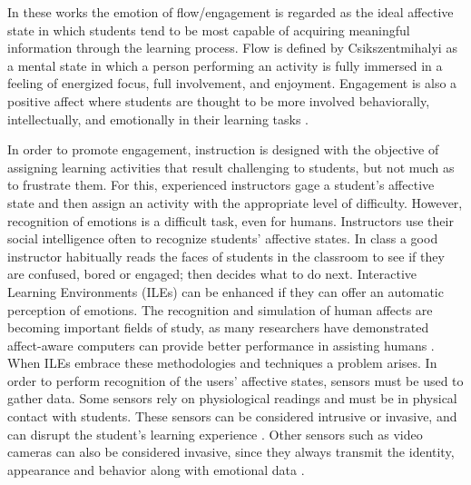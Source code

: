 \documentclass[a4paper]{llncs}
\begin{document}
In these works the emotion of flow/engagement is regarded as the ideal affective state in which
students tend to be most capable of acquiring meaningful information through the
learning process. Flow is defined by Csikszentmihalyi \cite{csikszentmihalyi1990flow}
as a mental state in which a person performing an activity is fully immersed in a feeling of
energized focus, full involvement, and enjoyment. Engagement is also a positive
affect where students are thought to be more involved behaviorally,
intellectually, and emotionally in their learning tasks \cite{bangert2002teacher}.

In order to promote engagement, instruction is designed with the
objective of assigning learning activities
that result challenging to students, but not much as to frustrate them. For
this, experienced instructors gage a student’s affective state and then assign
an activity with the appropriate level of difficulty. However, recognition of 
emotions is a difficult task, even
for humans. Instructors use their social intelligence often to recognize
students’ affective states. In class a good instructor habitually reads the
faces of students in the classroom to see if they are confused, bored or
engaged; then decides what to do next. Interactive Learning Environments (ILEs)
can be enhanced if they can offer an
automatic perception of emotions. The recognition and simulation of human
affects are becoming important fields of study, as many researchers have
demonstrated affect-aware computers can provide better performance in assisting
humans \cite{picard2001toward}. When ILEs embrace these methodologies and techniques a
problem arises. In order to perform recognition of the users' affective states,
sensors must be used to gather data. Some sensors rely on physiological readings
and must be in physical contact with students. These sensors can be considered
intrusive or invasive, and can disrupt the student’s learning experience 
\cite{zhai2008stress,sidney2005integrating,arroyo2009emotion}.
Other sensors such as video cameras can also be considered invasive, since they always transmit the
identity, appearance and behavior along with emotional data \cite{picard2001toward}.
\end{document}
